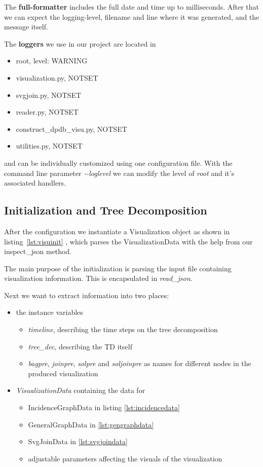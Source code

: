 \documentclass[a4paper, 12pt, bibliography=totoc]{scrartcl}
\begin{document}
The \textbf{full-formatter} includes the full date and time up to milliseconds. After that we can expect the logging-level, filename and line where it was generated, and the message itself.

The \textbf{loggers} we use in our project are located in 
\begin{itemize}
	\item root, level: WARNING
	\item visualization.py, NOTSET
	\item svgjoin.py, NOTSET
    \item reader.py, NOTSET
	\item construct\_dpdb\_visu.py, NOTSET
	\item utilities.py, NOTSET
\end{itemize}
and can be individually customized using one configuration file.
With the command line parameter \textit{-{}-loglevel} we can modify the level of \textit{root} and it's associated handlers.

\subsection{Initialization and Tree Decomposition}

After the configuration we instantiate a Visualization object as shown in listing~\ref{lst:visuinit} , which parses the VisualizationData with the help from our inspect\_json method. 

The main purpose of the initialization is parsing the input file containing visualization information.
This is encapsulated in \textit{read\_json}.

Next we want to extract information into two places: 
\begin{itemize}
	\item the instance variables 
	\begin{itemize}
		\item \textit{timeline}, describing the time steps on the tree decomposition
		\item \textit{tree\_dec}, describing the TD itself
		\item \textit{bagpre}, \textit{joinpre}, \textit{solpre} and \textit{soljoinpre} as names for different nodes in the produced visualization
	\end{itemize}
	\item \textit{VisualizationData} containing the data for 
	\begin{itemize}
		\item IncidenceGraphData in listing \ref{lst:incidencedata}
		\item GeneralGraphData in \ref{lst:gengraphdata}
		\item SvgJoinData in \ref{lst:svgjoindata}
		\item adjustable parameters affecting the visuals of the visualization
	\end{itemize}
\end{itemize}
\end{document}
